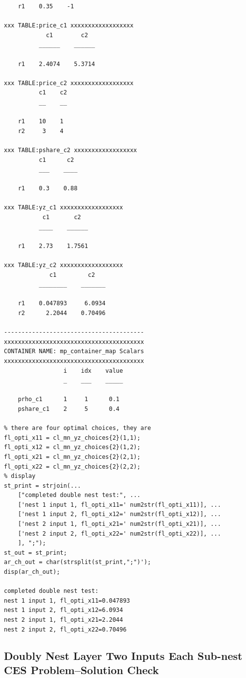 \documentclass[
]{book}
\begin{document}
\begin{verbatim}
    r1    0.35    -1

xxx TABLE:price_c1 xxxxxxxxxxxxxxxxxx
            c1        c2  
          ______    ______

    r1    2.4074    5.3714

xxx TABLE:price_c2 xxxxxxxxxxxxxxxxxx
          c1    c2
          __    __

    r1    10    1 
    r2     3    4 

xxx TABLE:pshare_c2 xxxxxxxxxxxxxxxxxx
          c1      c2 
          ___    ____

    r1    0.3    0.88

xxx TABLE:yz_c1 xxxxxxxxxxxxxxxxxx
           c1       c2  
          ____    ______

    r1    2.73    1.7561

xxx TABLE:yz_c2 xxxxxxxxxxxxxxxxxx
             c1         c2   
          ________    _______

    r1    0.047893     6.0934
    r2      2.2044    0.70496

----------------------------------------
xxxxxxxxxxxxxxxxxxxxxxxxxxxxxxxxxxxxxxxx
CONTAINER NAME: mp_container_map Scalars
xxxxxxxxxxxxxxxxxxxxxxxxxxxxxxxxxxxxxxxx
                 i    idx    value
                 _    ___    _____

    prho_c1      1     1      0.1 
    pshare_c1    2     5      0.4 

% there are four optimal choices, they are
fl_opti_x11 = cl_mn_yz_choices{2}(1,1);
fl_opti_x12 = cl_mn_yz_choices{2}(1,2);
fl_opti_x21 = cl_mn_yz_choices{2}(2,1);
fl_opti_x22 = cl_mn_yz_choices{2}(2,2);
% display
st_print = strjoin(...
    ["completed double nest test:", ...
    ['nest 1 input 1, fl_opti_x11=' num2str(fl_opti_x11)], ...
    ['nest 1 input 2, fl_opti_x12=' num2str(fl_opti_x12)], ...
    ['nest 2 input 1, fl_opti_x21=' num2str(fl_opti_x21)], ...
    ['nest 2 input 2, fl_opti_x22=' num2str(fl_opti_x22)], ...
    ], ";");
st_out = st_print;
ar_ch_out = char(strsplit(st_print,";")');
disp(ar_ch_out);

completed double nest test:         
nest 1 input 1, fl_opti_x11=0.047893
nest 1 input 2, fl_opti_x12=6.0934  
nest 2 input 1, fl_opti_x21=2.2044  
nest 2 input 2, fl_opti_x22=0.70496 
\end{verbatim}

\hypertarget{doubly-nest-layer-two-inputs-each-sub-nest-ces-problemsolution-check}{%
\subsection{Doubly Nest Layer Two Inputs Each Sub-nest CES Problem--Solution Check}\label{doubly-nest-layer-two-inputs-each-sub-nest-ces-problemsolution-check}}
\end{document}
